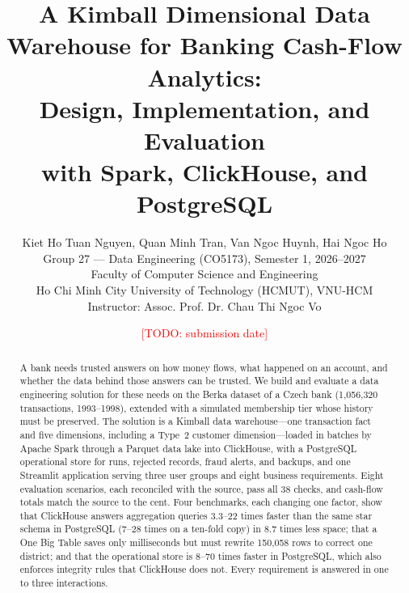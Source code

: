 \documentclass[peerreview]{IEEEtran}
\newcommand{\todo}[1]{\textcolor{red}{[TODO: #1]}}
\begin{document}
\title{A Kimball Dimensional Data Warehouse for Banking Cash-Flow Analytics: \\
Design, Implementation, and Evaluation \\ with Spark, ClickHouse, and PostgreSQL}

\author{Kiet Ho Tuan Nguyen, Quan Minh Tran, Van Ngoc Huynh, Hai Ngoc Ho \\
Group 27 --- Data Engineering (CO5173), Semester 1, 2026--2027\\
Faculty of Computer Science and Engineering\\
Ho Chi Minh City University of Technology (HCMUT), VNU-HCM\\
Instructor: Assoc. Prof. Dr. Chau Thi Ngoc Vo\\
}
\date{\todo{submission date}}

\maketitle
\tableofcontents
\listoffigures
\listoftables

\IEEEpeerreviewmaketitle

\begin{abstract}
A bank needs trusted answers on how money flows, what happened on an account, and whether
the data behind those answers can be trusted. We build and evaluate a data engineering
solution for these needs on the Berka dataset of a Czech bank (1,056,320 transactions,
1993--1998), extended with a simulated membership tier whose history must be preserved. The
solution is a Kimball data warehouse---one transaction fact and five dimensions, including a
Type~2 customer dimension---loaded in batches by Apache Spark through a Parquet data lake into
ClickHouse, with a PostgreSQL operational store for runs, rejected records, fraud alerts, and
backups, and one Streamlit application serving three user groups and eight business
requirements. Eight evaluation scenarios, each reconciled with the source, pass all 38
checks, and cash-flow totals match the source to the cent. Four benchmarks, each changing one
factor, show that ClickHouse answers aggregation queries 3.3--22 times faster than the same
star schema in PostgreSQL (7--28 times on a ten-fold copy) in 8.7 times less space; that a
One Big Table saves only milliseconds but must rewrite 150,058 rows to correct one district;
and that the operational store is 8--70 times faster in PostgreSQL, which also enforces
integrity rules that ClickHouse does not. Every requirement is answered in one to three
interactions.
\end{abstract}
\end{document}
